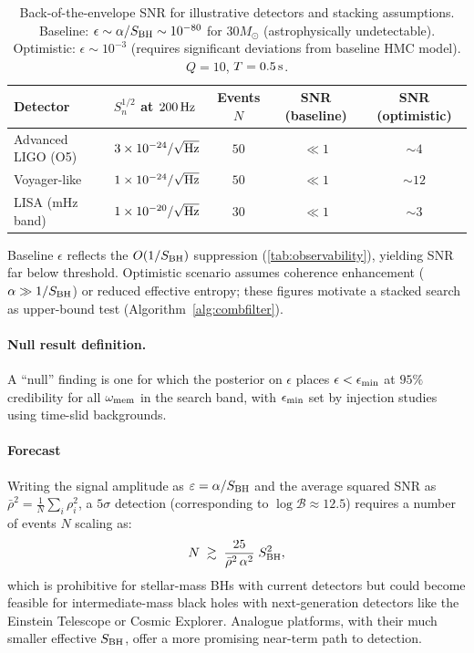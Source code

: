 \documentclass[a4paper,11pt]{article}
\newcommand{\HMC}{\textup{\textsc{HMC}}\xspace}
\theoremstyle{plain}
\theoremstyle{definition}
\theoremstyle{remark}
\begin{document}
\begin{table}[t]
\centering
\caption{Back-of-the-envelope SNR for illustrative detectors and stacking assumptions. Baseline: $\epsilon\sim \alpha/S_{\rm BH}\sim 10^{-80}$ for $30M_\odot$ (astrophysically undetectable). Optimistic: $\epsilon\sim 10^{-3}$ (requires significant deviations from baseline \HMC{} model). $Q=10$, $T=0.5\,{\rm s}$.}
\label{tab:snr}
\footnotesize
\setlength{\tabcolsep}{4pt}
\begin{tabularx}{\linewidth}{@{}Y Y c c c@{}}
\toprule
Detector & $S_n^{1/2}$ at $200\,{\rm Hz}$ & Events $N$ & SNR (baseline) & SNR (optimistic) \\
\midrule
Advanced LIGO (O5) & $3\times 10^{-24}/\sqrt{\rm Hz}$ & $50$ & $\ll 1$ & $\sim 4$ \\
Voyager-like & $1\times 10^{-24}/\sqrt{\rm Hz}$ & $50$ & $\ll 1$ & $\sim 12$ \\
LISA (mHz band) & $1\times 10^{-20}/\sqrt{\rm Hz}$ & $30$ & $\ll 1$ & $\sim 3$ \\
\bottomrule
\end{tabularx}
\setlength{\tabcolsep}{6pt}
\par\smallskip
\footnotesize Baseline $\epsilon$ reflects the $O(1/S_{\rm BH})$ suppression (\cref{tab:observability}), yielding SNR far below threshold. Optimistic scenario assumes coherence enhancement ($\alpha\gg 1/S_{\rm BH}$) or reduced effective entropy; these figures motivate a stacked search as upper-bound test (Algorithm~\ref{alg:combfilter}).
\end{table}

\paragraph{Null result definition.}
A ``null'' finding is one for which the posterior on $\epsilon$ places $\epsilon<\epsilon_{\rm min}$ at $95\%$ credibility for all $\omega_{\rm mem}$ in the search band,
with $\epsilon_{\rm min}$ set by injection studies using time-slid backgrounds.

\paragraph{Forecast} Writing the signal amplitude as $\varepsilon=\alpha/S_{\rm BH}$ and the average squared SNR as $\bar{\rho}^2=\frac{1}{N}\sum_i \rho_i^2$, a $5\sigma$ detection (corresponding to $\log\mathcal{B} \approx 12.5$) requires a number of events $N$ scaling as:
\begin{equation}
N \;\gtrsim\; \frac{25}{\bar{\rho}^2\,\alpha^2}\; S_{\rm BH}^2,
\end{equation}
which is prohibitive for stellar-mass BHs with current detectors but could become feasible for intermediate-mass black holes with next-generation detectors like the Einstein Telescope or Cosmic Explorer. Analogue platforms, with their much smaller effective $S_{\rm BH}$, offer a more promising near-term path to detection.
\end{document}
